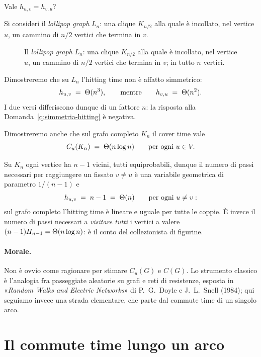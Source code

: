 \begin{domanda}\label{q:simmetria-hitting}
  Vale $h_{u,v} = h_{v,u}$?
\end{domanda}

Si consideri il \emph{lollipop graph} $L_n$: una clique $K_{n/2}$ alla quale è incollato,
nel vertice $u$, un cammino di $n/2$ vertici che termina in $v$.

\begin{figure}[H]
  \centering
  
  \caption{Il \emph{lollipop graph} $L_n$: una clique $K_{n/2}$ alla quale è incollato,
  nel vertice $u$, un cammino di $n/2$ vertici che termina in $v$; in tutto $n$ vertici.}
  \label{fig:lollipop}
\end{figure}


Dimostreremo che su $L_n$ l'hitting time non è affatto simmetrico:
\[
  h_{u,v} \;=\; \Theta(n^{3}),
  \qquad\text{mentre}\qquad
  h_{v,u} \;=\; \Theta(n^{2}).
\]
I due versi differiscono dunque di un fattore $n$: la risposta alla
Domanda~\ref{q:simmetria-hitting} è negativa.

Dimostreremo anche che sul grafo completo $K_n$ il cover time vale
\[
  C_u(K_n) \;=\; \Theta(n \log n) \qquad\text{per ogni } u \in V .
\]

\begin{osservazione}
  Su $K_n$ ogni vertice ha $n-1$ vicini, tutti equiprobabili, dunque il numero di passi
  necessari per raggiungere un fissato $v \neq u$ è una variabile geometrica di parametro
  $1/(n-1)$ e
  \[
    h_{u,v} \;=\; n-1 \;=\; \Theta(n) \qquad \text{per ogni } u \neq v :
  \]
  sul grafo completo l'hitting time è lineare e uguale per tutte le coppie. È invece il
  numero di passi necessari a \emph{visitare tutti} i vertici a valere
  $(n-1)H_{n-1} = \Theta(n \log n)$: è il conto del collezionista di figurine.
\end{osservazione}

\paragraph{Morale.} Non è ovvio come ragionare per stimare $C_u(G)$ e $C(G)$. Lo strumento
classico è l'analogia fra passeggiate aleatorie su grafi e reti di resistenze, esposta in
«\emph{Random Walks and Electric Networks}» di P.~G.~Doyle e J.~L.~Snell (1984); qui
seguiamo invece una strada elementare, che parte dal commute time di un singolo arco.

\section{Il commute time lungo un arco}

